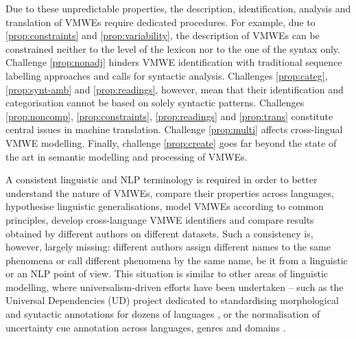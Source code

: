 \documentclass[output=paper,
modfonts,
]{langscibook}
\begin{document}
Due to these unpredictable properties, %
the description, identification, analysis and translation of VMWEs require dedicated procedures. For example, due to \ref{prop:constraints} and \ref{prop:variability}, the description of VMWEs can be constrained neither to the level of the lexicon nor to the one of the syntax only.   
Challenge \ref{prop:nonadj} hinders VMWE identification with traditional sequence labelling approaches and calls for syntactic analysis. Challenges \ref{prop:categ}, \ref{prop:synt-amb} and \ref{prop:readings},  however, mean that their identification and categorisation cannot be based on solely syntactic patterns. Challenges \ref{prop:noncomp}, \ref{prop:constraints}, \ref{prop:readings} and \ref{prop:trans} constitute central issues in machine translation. %
Challenge \ref{prop:multi} affects cross-lingual VMWE modelling. Finally, challenge \ref{prop:create} goes far beyond the state of the art in semantic modelling and processing of VMWEs.


A consistent linguistic and NLP terminology is required in order to better understand the nature of VMWEs, compare their properties across languages, hypothesise linguistic generalisations, model VMWEs according to common principles, develop cross-language VMWE identifiers and compare results obtained by different authors on different datasets. Such a consistency is, however, largely missing: different authors assign different names to the same phenomena or call different phenomena by the same name, be it from a linguistic or an NLP point of view. This situation is similar to other areas of linguistic modelling, where universalism-driven efforts have been undertaken -- such as the Universal Dependencies (UD) project dedicated to standardising morphological and syntactic annotations for dozens of languages \citep{univdep}, or the normalisation of uncertainty cue annotation across languages, genres and domains \citep{cl_uc}. 

 
\end{document}
